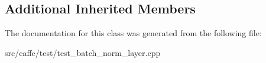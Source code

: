 \subsection*{Additional Inherited Members}


The documentation for this class was generated from the following file\+:\begin{DoxyCompactItemize}
\item 
src/caffe/test/test\+\_\+batch\+\_\+norm\+\_\+layer.\+cpp\end{DoxyCompactItemize}
